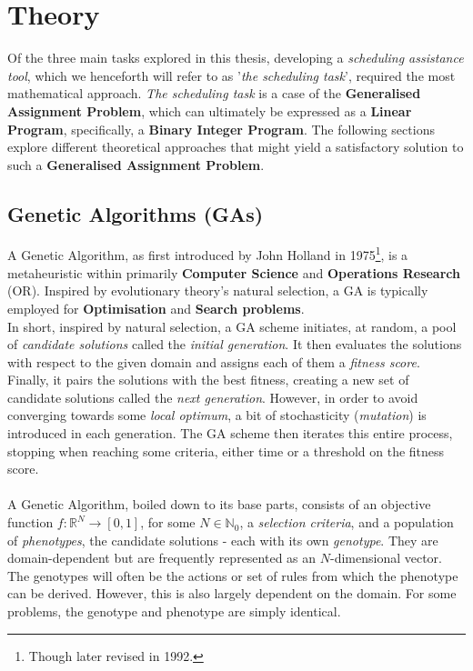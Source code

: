 \section{Theory}
Of the three main tasks explored in this thesis, developing a \textit{scheduling assistance tool}, which we henceforth will refer to as '\textit{the scheduling task}', required the most mathematical approach. \textit{The scheduling task} is a case of the \textbf{Generalised Assignment Problem}\cite{Wiki-general-assignment-prob}, which can ultimately be expressed as a \textbf{Linear Program}\cite{Wiki-linear-programming}, specifically, a \textbf{Binary Integer Program}.
The following sections explore different theoretical approaches that might yield a satisfactory solution to such a \textbf{Generalised Assignment Problem}.

\subsection{Genetic Algorithms (GAs)}
A Genetic Algorithm, as first introduced by John Holland\cite{Genetic-Algorithm-original} in 1975\footnote{Though later revised in 1992.}, is a metaheuristic within primarily \textbf{Computer Science} and \textbf{Operations Research} (OR). Inspired by evolutionary theory's natural selection, a GA is typically employed for \textbf{Optimisation} and \textbf{Search problems}.
\\
In short, inspired by natural selection, a GA scheme initiates, at random, a pool of \textit{candidate solutions} called the \textit{initial generation}. It then evaluates the solutions with respect to the given domain and assigns each of them a \textit{fitness score}. Finally, it pairs the solutions with the best fitness, creating a new set of candidate solutions called the \textit{next generation}. However, in order to avoid converging towards some \textit{local optimum}, a bit of stochasticity (\textit{mutation}) is introduced in each generation. The GA scheme then iterates this entire process, stopping when reaching some criteria, either time or a threshold on the fitness score.
\\
\\
A Genetic Algorithm, boiled down to its base parts, consists of an objective function $f : \mathbb{R}^N \rightarrow [0,1]$, for some $N \in \mathbb{N}_0$, a \textit{selection criteria}, and a population of \textit{phenotypes}, the candidate solutions - each with its own \textit{genotype}. They are domain-dependent but are frequently represented as an $N$-dimensional vector. The genotypes will often be the actions or set of rules from which the phenotype can be derived. However, this is also largely dependent on the domain. For some problems, the genotype and phenotype are simply identical.
